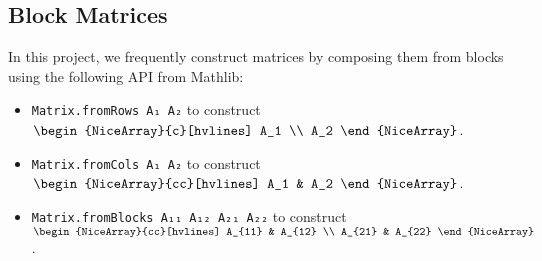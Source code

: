 \subsection{Block Matrices}

In this project, we frequently construct matrices by composing them from blocks using the following API from Mathlib:
\begin{itemize}
    \item \texttt{Matrix.fromRows A₁ A₂} to construct
    $\begin{NiceArray}{c}[hvlines]
       A_1 \\
       A_2
    \end{NiceArray}$.
    \item \texttt{Matrix.fromCols A₁ A₂} to construct
    $\begin{NiceArray}{cc}[hvlines]
       A_1 & A_2
    \end{NiceArray}$.
    \item \texttt{Matrix.fromBlocks A₁₁ A₁₂ A₂₁ A₂₂} to construct\newline
    $\begin{NiceArray}{cc}[hvlines]
       A_{11} & A_{12} \\
       A_{21} & A_{22}
    \end{NiceArray}$.
\end{itemize}

